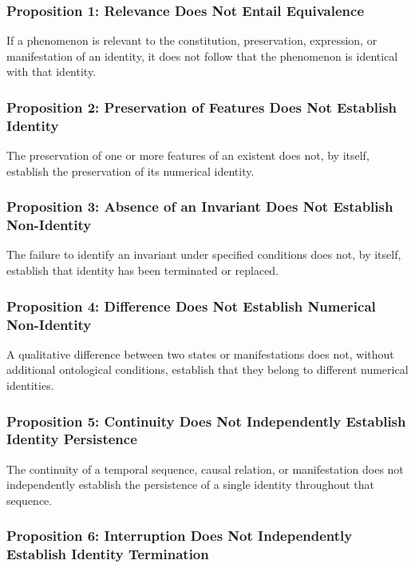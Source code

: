 \subsubsection{Proposition 1: Relevance Does Not Entail Equivalence}

If a phenomenon is relevant to the constitution,
preservation, expression, or manifestation of an identity,
it does not follow that the phenomenon is identical
with that identity.

\subsubsection{Proposition 2: Preservation of Features Does Not Establish Identity}

The preservation of one or more features of an existent
does not, by itself, establish the preservation of its
numerical identity.

\subsubsection{Proposition 3: Absence of an Invariant Does Not Establish Non-Identity}

The failure to identify an invariant under specified
conditions does not, by itself, establish that identity
has been terminated or replaced.

\subsubsection{Proposition 4: Difference Does Not Establish Numerical Non-Identity}

A qualitative difference between two states or
manifestations does not, without additional ontological
conditions, establish that they belong to different
numerical identities.

\subsubsection{Proposition 5: Continuity Does Not Independently Establish Identity Persistence}

The continuity of a temporal sequence, causal relation,
or manifestation does not independently establish the
persistence of a single identity throughout that sequence.

\subsubsection{Proposition 6: Interruption Does Not Independently Establish Identity Termination}

